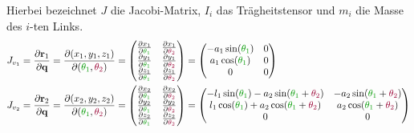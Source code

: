 \documentclass[a4paper, 12pt]{scrartcl}
\newcommand{\gruen}[2][gruen]{\textcolor{#1}{#2}}
\newcommand{\dunkelrot}[2][dunkelrot]{\textcolor{#1}{#2}}
\begin{document}
Hierbei bezeichnet $J$ die Jacobi-Matrix, $I_i$ das Trägheitstensor 
und $m_i$ die Masse des $i$-ten Links.
\begin{align*}
    J_{v_1} &=
    \frac{\partial \textbf{r}_1}{\partial \textbf{q}}
    =
    \frac{\partial (x_1,y_1,z_1)}{\partial (\gruen{\theta_1}, \dunkelrot{\theta_2})}
    =
    \begin{pmatrix}
        \frac{\partial x_1}{\partial \gruen{\theta_1}} 
        & \frac{\partial x_1}{\partial \dunkelrot{\theta_2}} \\
        \frac{\partial y_1}{\partial \gruen{\theta_1}} 
        & \frac{\partial y_1}{\partial \dunkelrot{\theta_2}} \\
        \frac{\partial z_1}{\partial \gruen{\theta_1}} 
        & \frac{\partial z_1}{\partial \dunkelrot{\theta_2}} 
    \end{pmatrix}
    =
    \begin{pmatrix}
        -a_1 \sin(\gruen{\theta_1}) & 0 \\
        a_1 \cos(\gruen{\theta_1}) & 0 \\
        0 & 0
    \end{pmatrix}
    \\
    J_{v_2} &=
    \frac{\partial \textbf{r}_2}{\partial \textbf{q}}
    =
    \frac{\partial (x_2,y_2,z_2)}{\partial (\gruen{\theta_1}, \dunkelrot{\theta_2})}
    =
    \begin{pmatrix}
        \frac{\partial x_2}{\partial \gruen{\theta_1}} 
        & \frac{\partial x_2}{\partial \dunkelrot{\theta_2}} \\
        \frac{\partial y_2}{\partial \gruen{\theta_1}} 
        & \frac{\partial y_2}{\partial \dunkelrot{\theta_2}} \\
        \frac{\partial z_2}{\partial \gruen{\theta_1}}
        & \frac{\partial z_2}{\partial \dunkelrot{\theta_2}}
    \end{pmatrix} 
    =
    \begin{pmatrix}
        -l_1 \sin(\gruen{\theta_1}) - a_2 \sin(\gruen{\theta_1} + \dunkelrot{\theta_2}) 
        & -a_2 \sin(\gruen{\theta_1} + \dunkelrot{\theta_2}) \\
        l_1 \cos(\gruen{\theta_1}) + a_2 \cos(\gruen{\theta_1} + \dunkelrot{\theta_2}) 
        & a_2 \cos(\gruen{\theta_1} + \dunkelrot{\theta_2}) \\
        0 & 0
    \end{pmatrix}
\end{align*}
\end{document}
